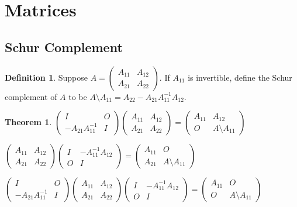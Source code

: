 \documentclass{book}
\newtheorem{theorem}{Theorem}[section]
\theoremstyle{definition}
\newtheorem{definition}{Definition}[section]
\begin{document}
\section{Matrices}

\subsection{Schur Complement}
\begin{definition}
    Suppose $A=\begin{pmatrix}
        A_{11} & A_{12}\\
         A_{21}&A_{22}
       \end{pmatrix}$. If $A_{11}$ is invertible, define the Schur complement of $A$ to be
        $A\setminus A_{11}=A_{22}-A_{21}A_{11}^{-1}A_{12}$.

\end{definition}
\begin{theorem}
    $\begin{pmatrix}
        I & O\\
        -A_{21}A_{11}^{-1} &I
       \end{pmatrix}
       \begin{pmatrix}
        A_{11} & A_{12}\\
        A_{21} & A_{22}
       \end{pmatrix}=\begin{pmatrix}
         A_{11}& A_{12}\\
        O &A\setminus A_{11}
       \end{pmatrix}$\par
       $\begin{pmatrix}
       A_{11} &A_{12} \\
       A_{21} &A_{22}
      \end{pmatrix}\begin{pmatrix}
       I & -A_{11}^{-1}A_{12}\\
       O & I
      \end{pmatrix}=\begin{pmatrix}
        A_{11}& O\\
        A_{21}& A\setminus A_{11}
      \end{pmatrix}$\par
      $\begin{pmatrix}
        I & O\\
        -A_{21}A_{11}^{-1} &I
       \end{pmatrix}\begin{pmatrix}
        A_{11} & A_{12}\\
        A_{21} & A_{22}
       \end{pmatrix}\begin{pmatrix}
        I & -A_{11}^{-1}A_{12}\\
        O & I
       \end{pmatrix}
      =\begin{pmatrix}
       A_{11} &O \\
       O &A\setminus A_{11}
      \end{pmatrix}$
\end{theorem}
\end{document}
